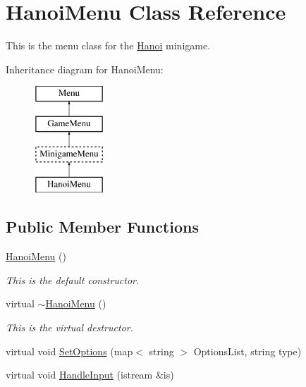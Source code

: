 \hypertarget{classHanoiMenu}{\section{Hanoi\-Menu Class Reference}
\label{classHanoiMenu}
}


This is the menu class for the \hyperlink{classHanoi}{Hanoi} minigame.  


Inheritance diagram for Hanoi\-Menu\-:\begin{figure}[H]
\begin{center}
\leavevmode
\includegraphics[height=4.000000cm]{classHanoiMenu}
\end{center}
\end{figure}
\subsection*{Public Member Functions}
\begin{DoxyCompactItemize}
\item 
\hypertarget{classHanoiMenu_a77aa5dc29b4c2954983e0471b8421d57}{\hyperlink{classHanoiMenu_a77aa5dc29b4c2954983e0471b8421d57}{Hanoi\-Menu} ()}\label{classHanoiMenu_a77aa5dc29b4c2954983e0471b8421d57}

\begin{DoxyCompactList}\small\item\em This is the default constructor. \end{DoxyCompactList}\item 
\hypertarget{classHanoiMenu_a80744afb9fe2111305ed0876ea371cd0}{virtual \hyperlink{classHanoiMenu_a80744afb9fe2111305ed0876ea371cd0}{$\sim$\-Hanoi\-Menu} ()}\label{classHanoiMenu_a80744afb9fe2111305ed0876ea371cd0}

\begin{DoxyCompactList}\small\item\em This is the virtual destructor. \end{DoxyCompactList}\item 
virtual void \hyperlink{classHanoiMenu_a1b6275a079452173e058c14f3b822271}{Set\-Options} (map$<$ string $>$ Options\-List, string type)
\item 
virtual void \hyperlink{classHanoiMenu_a8d287d810bc4cf49775503470830e48f}{Handle\-Input} (istream \&is)
\end{DoxyCompactItemize}
